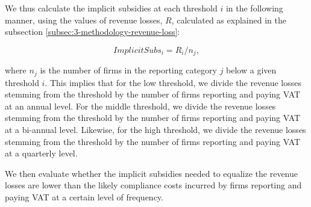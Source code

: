 
We thus calculate the implicit subsidies at each threshold $i$ in the following manner, using the values of revenue losses, $R$, calculated as explained in the subsection \ref{subsec:3-methodology-revenue-loss}:

\begin{equation}
ImplicitSubs_i = R_i / n_j,
\end{equation}

where $n_j$ is the number of firms in the reporting category $j$ below a given threshold $i$. This implies that for the low threshold, we divide the revenue losses stemming from the threshold by the number of firms reporting and paying VAT at an annual level. For the middle threshold, we divide the revenue losses stemming from the threshold by the number of firms reporting and paying VAT at a bi-annual level. Likewise, for the high threshold, we divide the revenue losses stemming from the threshold by the number of firms reporting and paying VAT at a quarterly level. 

We then evaluate whether the implicit subsidies needed to equalize the revenue losses are lower than the likely compliance costs incurred by firms reporting and paying VAT at a certain level of frequency.

